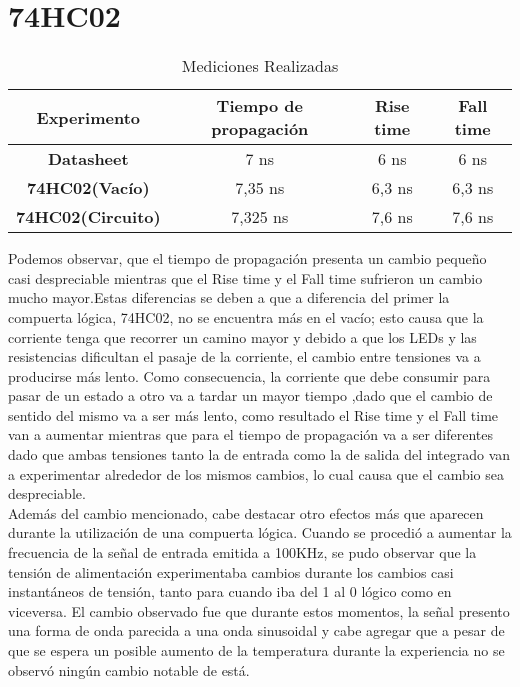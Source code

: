 \chapter*{74HC02}
\begin{center}
	\begin{table}[h!] 	%
		\begin{center}
		\caption{Mediciones Realizadas}
			\begin{tabular}{|c|c|c|c|}
				\hline
				\textbf{Experimento} & \textbf{Tiempo de propagación} & \textbf{Rise time} & \textbf{Fall time}\\
				\hline
				\textbf{Datasheet} & 7 ns & 6 ns & 6 ns\\
				\hline
				\textbf{74HC02(Vacío)} & 7,35 ns & 6,3 ns & 6,3 ns\\
				\hline
				\textbf{74HC02(Circuito)} & 7,325 ns & 7,6 ns & 7,6 ns\\
				\hline
			\end{tabular}
		\end{center}
	\end{table}
\end{center}
Podemos observar, que el tiempo de propagación presenta un cambio pequeño casi despreciable mientras que el Rise time y el Fall time sufrieron un cambio mucho mayor.Estas diferencias se deben a que a diferencia del primer la compuerta lógica, 74HC02, no se encuentra más en el vacío; esto causa que la corriente tenga que recorrer un camino mayor y debido a que los LEDs y las resistencias dificultan el pasaje de la corriente, el cambio entre tensiones va a producirse más lento. Como consecuencia, la corriente que debe consumir para pasar de un estado a otro va a tardar un mayor tiempo ,dado que el cambio de sentido del mismo va a ser más lento, como resultado el Rise time y el Fall time van a aumentar mientras que para el tiempo de propagación va a ser diferentes dado que ambas tensiones tanto la de entrada como la de salida del integrado van a experimentar alrededor de los mismos cambios, lo cual causa que el cambio sea despreciable.\\
Además del cambio mencionado, cabe destacar otro efectos más que aparecen durante la utilización de una compuerta lógica. Cuando se procedió a aumentar la frecuencia de la señal de entrada emitida a 100KHz, se pudo observar que la tensión de alimentación experimentaba cambios durante los cambios casi instantáneos de tensión, tanto para cuando iba del 1 al 0 lógico como en viceversa. El cambio observado fue que durante estos momentos, la señal presento una forma de onda parecida a una onda sinusoidal y cabe agregar que a pesar de que se espera un posible aumento de la temperatura durante la experiencia no se observó ningún cambio notable de está.\\
